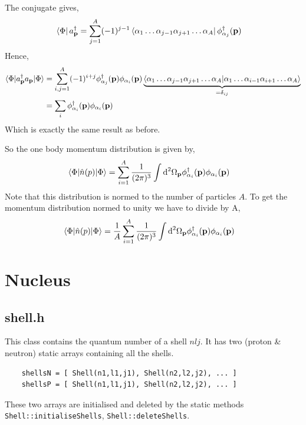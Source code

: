 \documentclass[10pt]{article}
\begin{document}
The conjugate gives,
\begin{align}
	\bra{\Phi} a_{\mathbf{p}}^{\dagger} &= \sum_{j=1}^{A} (-1)^{j-1} \bra{ \alpha_1 \ldots \alpha_{j-1} \alpha_{j+1} \ldots \alpha_A} \phi_{\alpha_j}^{\dagger}(\mathbf{p})
\end{align}
Hence,
\begin{align}
\braket{ \Phi | a_{\mathbf{p}}^{\dagger} a_{\mathbf{p}} | \Phi} &= \sum_{i,j=1}^{A} (-1)^{i+j} \phi_{\alpha_j}^{\dagger}(\mathbf{p}) \phi_{\alpha_{i}}(\mathbf{p})  \underbrace{\braket{ \alpha_1 \ldots \alpha_{j-1} \alpha_{j+1} \ldots \alpha_A | \alpha_1 \ldots \alpha_{i-1} \alpha_{i+1} \ldots \alpha_A }}_{=\delta_{ij}} \\
	&= \sum_{i} \phi_{\alpha_i}^{\dagger}(\mathbf{p}) \phi_{\alpha_{i}}(\mathbf{p})
\end{align}
Which is exactly the same result as before.



So the one body momentum distribution is given by,
\begin{align}
	\braket{ \Phi | \hat{n}(p) | \Phi} &=  \sum_{i=1}^{A} \frac{1}{(2 \pi)^{3}} \int \textrm{d}^{2} \Omega_{\mathbf{p}}\phi_{\alpha_i}^{\dagger}(\mathbf{p}) \phi_{\alpha_i}(\mathbf{p})
\end{align}
Note that this distribution is normed to the number of particles $A$. To get the momentum distribution normed to unity we have to divide by A,
\begin{align}
	\braket{ \Phi | \hat{n}(p) | \Phi} &=  \frac{1}{A} \sum_{i=1}^{A} \frac{1}{(2 \pi)^{3}} \int \textrm{d}^{2} \Omega_{\mathbf{p}}\phi_{\alpha_i}^{\dagger}(\mathbf{p}) \phi_{\alpha_i}(\mathbf{p})
\end{align}

\section{Nucleus}
\subsection{shell.h}
This class contains the quantum number of a shell $nlj$. It has two (proton \& neutron) static arrays containing all the shells.
\begin{verbatim}
	shellsN = [ Shell(n1,l1,j1), Shell(n2,l2,j2), ... ]
	shellsP = [ Shell(n1,l1,j1), Shell(n2,l2,j2), ... ]
\end{verbatim}
These two arrays are initialised and deleted by the static methods \texttt{Shell::initialiseShells}, \texttt{Shell::deleteShells}.
\end{document}
